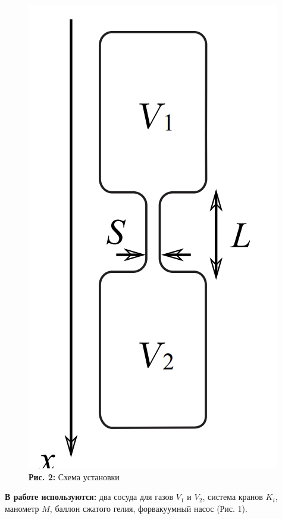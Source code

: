 \documentclass[12pt,a4paper]{scrartcl}
\begin{document}
\begin{center}
\begin{figure}[h]
\begin{minipage}{0.5\linewidth}
\begin{center}
				\includegraphics[scale=0.41]{PIC_2.png}
				\\\textbf{Рис. 2:} Схема установки
			\end{center}
		\end{minipage}
		\end{figure}
	\end{center}
	
	\begin{center}
		
	\end{center}
	
	\textbf{В работе используются:} два сосуда для газов $V_1$ и $V_2$, система кранов $K_i$, манометр $M$, баллон сжатого гелия, форвакуумный насос (Рис. 1).
	
\end{document}
